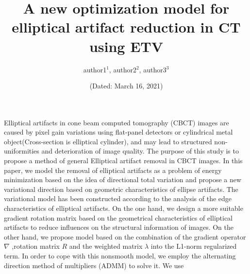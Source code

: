 \documentclass[hyperref]{ctexart}
\title{\textbf{A new optimization model for elliptical artifact reduction in CT using ETV}} %
\author{\sffamily author1$^1$, \sffamily author2$^2$, \sffamily author3$^3$}
\date{(Dated: March 16, 2021)} %
\begin{document}
\small
	\maketitle
	Elliptical artifacts in cone beam computed tomography (CBCT) images are caused by pixel gain variations using flat-panel detectors or cylindrical metal object(Cross-section is elliptical cylinder), and may lead to structured non-uniformities and deterioration of image quality. The purpose of this study is to propose a method of general Elliptical artifact removal in CBCT images. In this paper, we model the removal of elliptical artifacts as a problem of energy minimization based on the idea of directional total variation and propose a new variational direction based on geometric characteristics of ellipse artifacts. The variational model has been constructed according to the analysis of the edge characteristics of elliptical artifacts. On the one hand, we design a more suitable gradient rotation matrix based on the geometrical characteristics of elliptical artifacts to reduce influences on the structural information of images. On the other hand, we propose model based on the combination of the gradient operator $\nabla$ ,rotation matrix $R$ and the weighted matrix $\lambda$ into the L1-norm regularized term. In order to cope with this nonsmooth model, we employ the alternating direction method of multipliers (ADMM) to solve it. We use~~~\\  %
	
\end{document}
